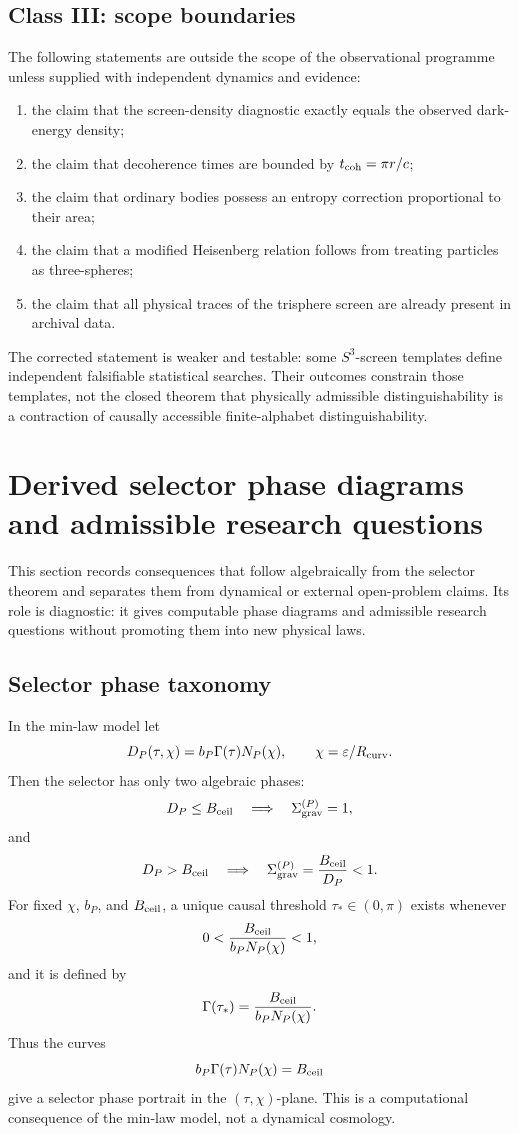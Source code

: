 \documentclass[11pt,a4paper]{article}
\begin{document}
\subsection{Class III: scope boundaries}

The following statements are outside the scope of the observational programme unless supplied with independent dynamics and evidence:
\begin{enumerate}
\item the claim that the screen-density diagnostic exactly equals the observed dark-energy density;
\item the claim that decoherence times are bounded by $t_{\rm coh}=\pi r/c$;
\item the claim that ordinary bodies possess an entropy correction proportional to their area;
\item the claim that a modified Heisenberg relation follows from treating particles as three-spheres;
\item the claim that all physical traces of the trisphere screen are already present in archival data.
\end{enumerate}

The corrected statement is weaker and testable: some $S^3$-screen templates define independent falsifiable statistical searches.  Their outcomes constrain those templates, not the closed theorem that physically admissible distinguishability is a contraction of causally accessible finite-alphabet distinguishability.



\section{Derived selector phase diagrams and admissible research questions}
\label{sec:derived-selector-programme}

This section records consequences that follow algebraically from the selector theorem and separates them from dynamical or external open-problem claims.  Its role is diagnostic: it gives computable phase diagrams and admissible research questions without promoting them into new physical laws.

\subsection{Selector phase taxonomy}

In the min-law model let
\[
D_P(\tau,\chi)=b_P\Gamma(\tau)N_P(\chi),
\qquad
\chi=\varepsilon/R_{\rm curv}.
\]
Then the selector has only two algebraic phases:
\[
D_P\le B_{\rm ceil}\quad\Longrightarrow\quad \Sigma_{\rm grav}^{(P)}=1,
\]
and
\[
D_P>B_{\rm ceil}\quad\Longrightarrow\quad
\Sigma_{\rm grav}^{(P)}=\frac{B_{\rm ceil}}{D_P}<1.
\]
For fixed $\chi$, $b_P$, and $B_{\rm ceil}$, a unique causal threshold $\tau_*\in(0,\pi)$ exists whenever
\[
0<\frac{B_{\rm ceil}}{b_PN_P(\chi)}<1,
\]
and it is defined by
\[
\Gamma(\tau_*)=\frac{B_{\rm ceil}}{b_PN_P(\chi)}.
\]
Thus the curves
\[
b_P\Gamma(\tau)N_P(\chi)=B_{\rm ceil}
\]
give a selector phase portrait in the $(\tau,\chi)$-plane.  This is a computational consequence of the min-law model, not a dynamical cosmology.
\end{document}

